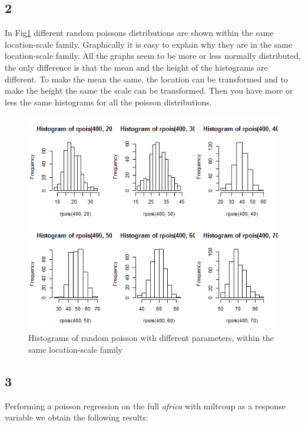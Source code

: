 \documentclass{article}
\begin{document}
    \subsection*{2}
      In Fig\ref{fig:Hist3_2} different random poissons distributions are shown within the same location-scale family.
      Graphically it is easy to explain why they are in the same location-scale family.
      All the graphs seem to be more or less normally distributed,
      the only difference is that the mean and the height of the histograms are different.
      To make the mean the same, the location can be transformed and to make the height the same the scale can be transformed.
      Then you have more or less the same histograms for all the poisson distributions.
      \begin{figure}[H]
          \centering
          \includegraphics[scale=0.3]{../results/3_2.png}
          \caption{Histograms of random poisson with different parameters, within the same location-scale family}
          \label{fig:Hist3_2}
      \end{figure}

    \subsection*{3}
    
    Performing a poisson regression on the full \textit{africa} with miltcoup as a response variable we obtain the following results:
    
\end{document}
